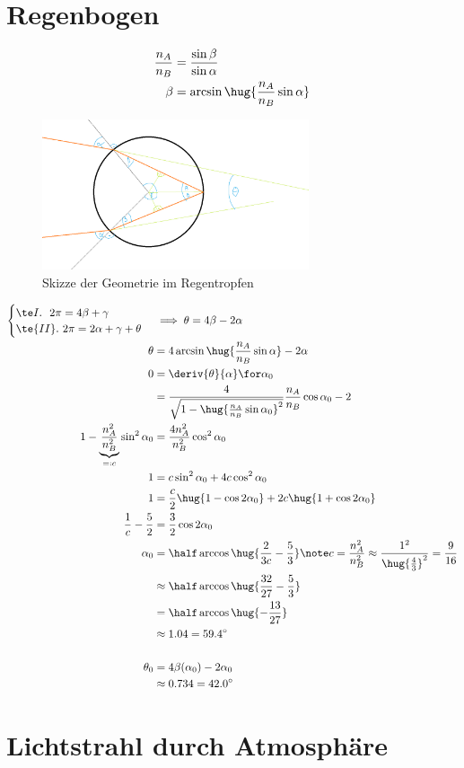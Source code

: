 \documentclass[ex,minted]{exercise}
\begin{document}
\section{Regenbogen}
\begin{align*}
    \frac{n_A}{n_B} &= \frac{\sin \beta}{\sin \alpha}\\
    \beta  &= \arcsin\hug{\frac{n_A}{n_B} \sin\alpha}
\end{align*}
\begin{figure}[h]
    \centering
    \includegraphics[width=0.7\textwidth]{3.png}
    \caption{Skizze der Geometrie im Regentropfen}
\end{figure}
\begin{align*}
    \begin{cases}
        \te I.\ \ 2\pi = 4\beta + \gamma\\
        \te{II}. \ 2\pi = 2\alpha + \gamma + \theta
    \end{cases}&\implies \theta =4\beta - 2 \alpha\\
    \theta &= 4 \arcsin\hug{\frac{n_A}{n_B} \sin\alpha} - 2 \alpha\\
    0 &= \deriv{\theta}{\alpha} \for \alpha_0\\
    &= \frac{4}{\sqrt{1 - \hug{\frac{n_A}{n_B} \sin\alpha_0}^2}}\frac{n_A}{n_B} \cos\alpha_0 -2\\
    1 -  \underbrace{\frac{n_A^2}{n_B^2}}_{=:c} \sin^2\alpha_0 &= \frac{4n_A^2}{n_B^2} \cos^2\alpha_0 \\
    1 &= c \sin^2\alpha_0 + 4 c \cos^2\alpha_0 \\
    1 &= \frac c2 \hug{1-\cos{2\alpha_0}} + 2 c \hug{1+\cos{2\alpha_0}} \\
    \frac1c - \frac 52 &= \frac 32 \cos{2\alpha_0} \\
    \alpha_0 &= \half\arccos\hug{\frac2{3c} - \frac{5}{3}}
    \note c=\frac{n_A^2}{n_B^2} \approx\frac{1^2}{\hug{\frac{4}{3}}^2}=\frac{9}{16}\\
    &\approx \half\arccos\hug{\frac{32}{27} - \frac{5}{3}}\\
    &= \half\arccos\hug{-\frac{13}{27}}\\
    &\approx 1.04 = 59.4 ^\circ\\
    \\
    \theta_0 &= 4\beta(\alpha_0) - 2\alpha_0\\
    &\approx 0.734 = 42.0^\circ
\end{align*}

\section{Lichtstrahl durch Atmosphäre}
\end{document}
